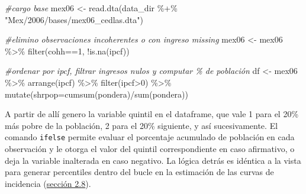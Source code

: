 \documentclass[
]{book}
\newenvironment{Shaded}{\begin{snugshade}}{\end{snugshade}}
\newcommand{\AttributeTok}[1]{\textcolor[rgb]{0.77,0.63,0.00}{#1}}
\newcommand{\CommentTok}[1]{\textcolor[rgb]{0.56,0.35,0.01}{\textit{#1}}}
\newcommand{\DecValTok}[1]{\textcolor[rgb]{0.00,0.00,0.81}{#1}}
\newcommand{\FunctionTok}[1]{\textcolor[rgb]{0.00,0.00,0.00}{#1}}
\newcommand{\NormalTok}[1]{#1}
\newcommand{\OtherTok}[1]{\textcolor[rgb]{0.56,0.35,0.01}{#1}}
\newcommand{\SpecialCharTok}[1]{\textcolor[rgb]{0.00,0.00,0.00}{#1}}
\newcommand{\StringTok}[1]{\textcolor[rgb]{0.31,0.60,0.02}{#1}}
\begin{document}
\begin{Shaded}
\begin{Highlighting}[]
\CommentTok{\#cargo base}
\NormalTok{mex06 }\OtherTok{\textless{}{-}} \FunctionTok{read.dta}\NormalTok{(data\_dir }\SpecialCharTok{\%+\%} \StringTok{"Mex/2006/bases/mex06\_cedlas.dta"}\NormalTok{)  }

\CommentTok{\#elimino observaciones incoherentes o con ingreso missing}
\NormalTok{mex06 }\OtherTok{\textless{}{-}}\NormalTok{ mex06 }\SpecialCharTok{\%\textgreater{}\%} \FunctionTok{filter}\NormalTok{(cohh}\SpecialCharTok{==}\DecValTok{1}\NormalTok{, }\SpecialCharTok{!}\FunctionTok{is.na}\NormalTok{(ipcf)) }

\CommentTok{\#ordenar por ipcf, filtrar ingresos nulos y computar \% de población}
\NormalTok{df }\OtherTok{\textless{}{-}}\NormalTok{  mex06  }\SpecialCharTok{\%\textgreater{}\%} \FunctionTok{arrange}\NormalTok{(ipcf) }\SpecialCharTok{\%\textgreater{}\%} \FunctionTok{filter}\NormalTok{(ipcf}\SpecialCharTok{\textgreater{}}\DecValTok{0}\NormalTok{) }\SpecialCharTok{\%\textgreater{}\%} 
       \FunctionTok{mutate}\NormalTok{(}\AttributeTok{shrpop=}\FunctionTok{cumsum}\NormalTok{(pondera)}\SpecialCharTok{/}\FunctionTok{sum}\NormalTok{(pondera))}
\end{Highlighting}
\end{Shaded}

A partir de allí genero la variable quintil en el dataframe, que vale 1 para el 20\% más pobre de la población, 2 para el 20\% siguiente, y así sucesivamente. El comando \texttt{ifelse} permite evaluar el porcentaje acumulado de población en cada observación y le otorga el valor del quintil correspondiente en caso afirmativo, o deja la variable inalterada en caso negativo. La lógica detrás es idéntica a la vista para generar percentiles dentro del bucle en la estimación de las curvas de incidencia (\protect\hyperlink{cap-2.8}{sección 2.8}).
\end{document}
